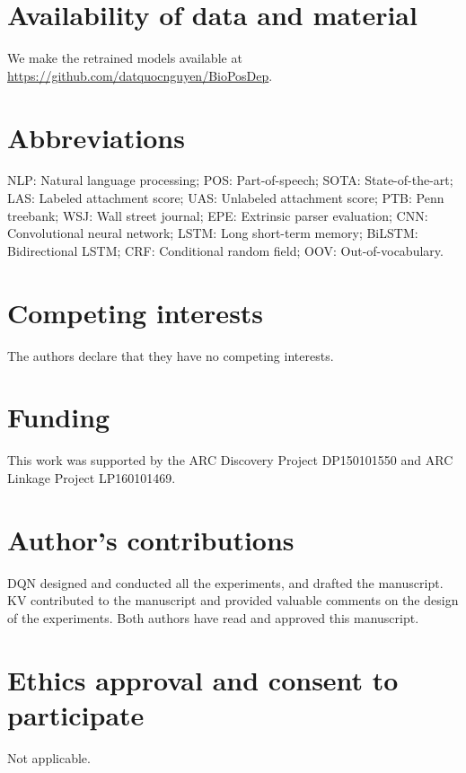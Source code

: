 \documentclass[twocolumn,hyperref]{bmcart}\pdfoutput=1
\begin{document}
 






\begin{backmatter}

\section*{Availability of data and material}

We make the retrained models available at \url{https://github.com/datquocnguyen/BioPosDep}.

\section*{Abbreviations}

NLP: Natural language processing; POS: Part-of-speech; SOTA: State-of-the-art; LAS: Labeled attachment score; UAS: Unlabeled attachment score; PTB: Penn treebank; WSJ:  Wall street journal; EPE: Extrinsic parser evaluation; CNN: Convolutional neural network; LSTM: Long short-term memory; BiLSTM: Bidirectional LSTM; CRF: Conditional random field; OOV: Out-of-vocabulary. 


\section*{Competing interests}
  The authors declare that they have no competing interests.
  
\section*{Funding}
This work was supported by the ARC Discovery Project DP150101550 and ARC Linkage Project LP160101469. 

\section*{Author's contributions}
    DQN designed and conducted all the experiments, and drafted the manuscript. KV contributed to the manuscript and provided valuable comments on the design of the experiments.  Both authors have read and approved this manuscript.
    
\section*{Ethics approval and consent to participate}
Not applicable.


\end{backmatter}
\end{document}
